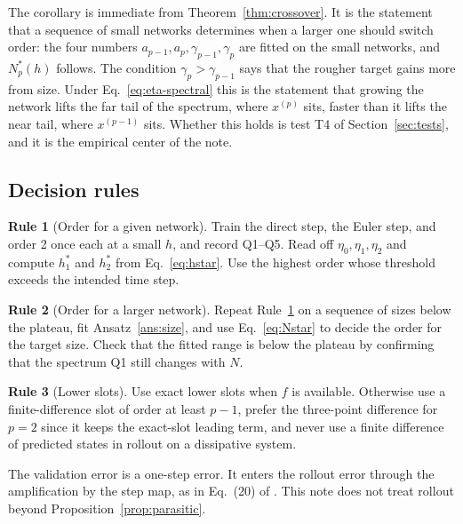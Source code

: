 \documentclass[11pt]{article}
\theoremstyle{definition}
\newtheorem{designrule}{Rule}
\theoremstyle{remark}
\begin{document}
The corollary is immediate from Theorem~\ref{thm:crossover}.
It is the statement that a sequence of small networks determines when a larger one should switch order: the four numbers $a_{p-1}, a_p, \gamma_{p-1}, \gamma_p$ are fitted on the small networks, and $N_p^\ast(h)$ follows.
The condition $\gamma_p > \gamma_{p-1}$ says that the rougher target gains more from size.
Under Eq.~\eqref{eq:eta-spectral} this is the statement that growing the network lifts the far tail of the spectrum, where $x^{(p)}$ sits, faster than it lifts the near tail, where $x^{(p-1)}$ sits.
Whether this holds is test T4 of Section~\ref{sec:tests}, and it is the empirical center of the note.

\subsection{Decision rules}

\begin{designrule}[Order for a given network]\label{rule:order}
Train the direct step, the Euler step, and order 2 once each at a small $h$, and record Q1--Q5.
Read off $\eta_0, \eta_1, \eta_2$ and compute $h_1^\ast$ and $h_2^\ast$ from Eq.~\eqref{eq:hstar}.
Use the highest order whose threshold exceeds the intended time step.
\end{designrule}

\begin{designrule}[Order for a larger network]\label{rule:size}
Repeat Rule~\ref{rule:order} on a sequence of sizes below the plateau, fit Ansatz~\ref{ans:size}, and use Eq.~\eqref{eq:Nstar} to decide the order for the target size.
Check that the fitted range is below the plateau by confirming that the spectrum Q1 still changes with $N$.
\end{designrule}

\begin{designrule}[Lower slots]\label{rule:fd}
Use exact lower slots when $f$ is available.
Otherwise use a finite-difference slot of order at least $p-1$, prefer the three-point difference for $p = 2$ since it keeps the exact-slot leading term, and never use a finite difference of predicted states in rollout on a dissipative system.
\end{designrule}

The validation error is a one-step error.
It enters the rollout error through the amplification by the step map, as in Eq.~(20) of \cite{ainslie2026}.
This note does not treat rollout beyond Proposition~\ref{prop:parasitic}.
\end{document}

